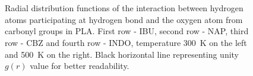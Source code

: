 \begin{figure}[H]
	\\
	\vspace{-0.2cm}
	\\
	\vspace{-0.2cm}
	\caption{Radial distribution functions of the interaction between hydrogen atoms participating at hydrogen bond and the oxygen atom from carbonyl groups in PLA. First row - IBU, second row - NAP, third row - CBZ and fourth row - INDO, temperature 300~K on the left and 500~K on the right. Black horizontal line representing unity $g(r)$ value for better readability.}
	\label{fig:carbonyl}
\end{figure}

